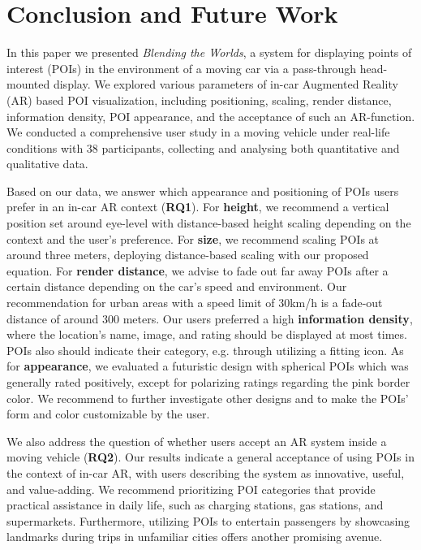 \section{Conclusion and Future Work}
\label{section:Conclusion}
In this paper we presented \textit{Blending the Worlds}, a system for displaying points of interest (POIs) in the environment of a moving car via a pass-through head-mounted display. We explored various parameters of in-car Augmented Reality (AR) based POI visualization, including positioning, scaling, render distance, information density, POI appearance, and the acceptance of such an AR-function. We conducted a comprehensive user study in a moving vehicle under real-life conditions with 38 participants, collecting and analysing both quantitative and qualitative data. 

Based on our data, we answer which appearance and positioning of POIs users prefer in an in-car AR context (\textbf{RQ1}). For \textbf{height}, we recommend a vertical position set around eye-level with distance-based height scaling depending on the context and the user's preference. For \textbf{size}, we recommend scaling POIs at around three meters, deploying distance-based scaling with our proposed equation. For \textbf{render distance}, we advise to fade out far away POIs after a certain distance depending on the car's speed and environment. Our recommendation for urban areas with a speed limit of 30km/h is a fade-out distance of around 300 meters. Our users preferred a high \textbf{information density}, where the location's name, image, and rating should be displayed at most times. POIs also should indicate their category, e.g. through utilizing a fitting icon. As for \textbf{appearance}, we evaluated a futuristic design with spherical POIs which was generally rated positively, except for polarizing ratings regarding the pink border color. We recommend to further investigate other designs and to make the POIs' form and color customizable by the user.

We also address the question of whether users accept an AR system inside a moving vehicle (\textbf{RQ2}). Our results indicate a general acceptance of using POIs in the context of in-car AR, with users describing the system as innovative, useful, and value-adding. We recommend prioritizing POI categories that provide practical assistance in daily life, such as charging stations, gas stations, and supermarkets. Furthermore, utilizing POIs to entertain passengers by showcasing landmarks during trips in unfamiliar cities offers another promising avenue.

